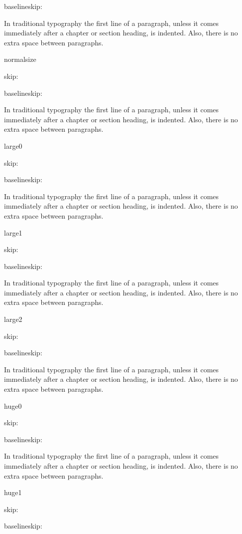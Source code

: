 \documentclass[a4paper, 12pt]{memoir}
\begin{document}
 baselineskip: \the\baselineskip 
  
 In traditional typography the first line of a paragraph, unless it comes immediately after a
chapter or section heading, is indented. Also, there is no extra space between paragraphs.

\normalsize
 normalsize
 
 skip: \thefontsize
 
 baselineskip: \the\baselineskip 
 
In traditional typography the first line of a paragraph, unless it comes immediately after a
chapter or section heading, is indented. Also, there is no extra space between paragraphs.

\large
 large0
 
 skip: \thefontsize
 
 baselineskip: \the\baselineskip 
  
In traditional typography the first line of a paragraph, unless it comes immediately after a
chapter or section heading, is indented. Also, there is no extra space between paragraphs.

\Large
 large1
 
 skip: \thefontsize
 
 baselineskip: \the\baselineskip 
  
In traditional typography the first line of a paragraph, unless it comes immediately after a
chapter or section heading, is indented. Also, there is no extra space between paragraphs.

\LARGE
 large2 
 
 skip: \thefontsize
 
 baselineskip: \the\baselineskip 
 
In traditional typography the first line of a paragraph, unless it comes immediately after a
chapter or section heading, is indented. Also, there is no extra space between paragraphs.

\huge
 huge0 
 
 skip: \thefontsize
 
 baselineskip: \the\baselineskip 
 
In traditional typography the first line of a paragraph, unless it comes immediately after a
chapter or section heading, is indented. Also, there is no extra space between paragraphs.

\Huge
 huge1
 
 skip: \thefontsize
 
 baselineskip: \the\baselineskip 
 
\end{document}
